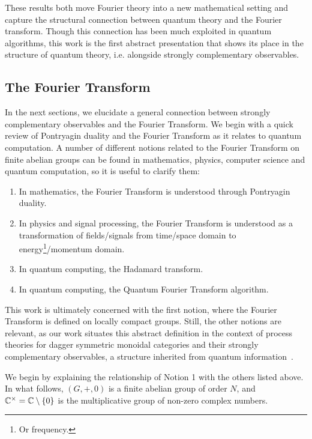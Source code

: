 These results both move Fourier theory into a new mathematical setting and capture the structural connection between quantum theory and the Fourier transform.  Though this connection has been much exploited in quantum algorithms, this work is the first abstract presentation that shows its place in the structure of quantum theory, i.e. alongside strongly complementary observables.

\subsection{The Fourier Transform}
\label{sec:FT}
In the next sections, we elucidate a general connection between strongly complementary observables and the Fourier Transform. We begin with a quick review of Pontryagin duality and the Fourier Transform as it relates to quantum computation. A number of different notions related to the Fourier Transform on finite abelian groups can be found in mathematics, physics, computer science and quantum computation, so it is useful to clarify them:

\begin{enumerate}
  \item[1.] In mathematics, the Fourier Transform is understood through Pontryagin duality.
  \item[2.] In physics and signal processing, the Fourier Transform is understood as a transformation of fields/signals from time/space domain to energy\footnote{Or frequency.}/momentum domain.
  \item[3.] In quantum computing, the Hadamard transform.
  \item[4.] In quantum computing, the Quantum Fourier Transform algorithm.
\end{enumerate}

This work is ultimately concerned with the first notion, where the Fourier Transform is defined on locally compact groups. Still, the other notions are relevant, as our work situates this abstract definition in the context of process theories for dagger symmetric monoidal categories and their strongly complementary observables, a structure inherited from quantum information~\cite{abramsky2008categorical, coecke2011interacting, coecke2015generalised}. 

We begin by explaining the relationship of Notion 1 with the others listed above. In what follows, $(G,+,0)$ is a finite abelian group of order $N$, and $\mathbb{C}^{\times}=\mathbb{C}\setminus\{0\}$ is the multiplicative group of non-zero complex numbers.

